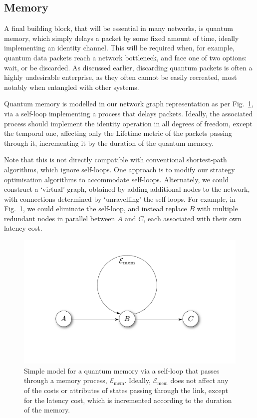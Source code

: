 \documentclass[aps,rmp,twocolumn,amsmath,amssymb,nofootinbib,superscriptaddress,longbibliography,floatfix]{revtex4-1}
\begin{document}
%
%

\subsection{Memory} \label{sec:memory}

A final building block, that will be essential in many networks, is quantum memory, which simply delays a packet by some fixed amount of time, ideally implementing an identity channel. This will be required when, for example, quantum data packets reach a network bottleneck, and face one of two options: wait, or be discarded. As discussed earlier, discarding quantum packets is often a highly undesirable enterprise, as they often cannot be easily recreated, most notably when entangled with other systems.

Quantum memory is modelled in our network graph representation as per Fig.~\ref{fig:memory}, via a self-loop implementing a process that delays packets. Ideally, the associated process should implement the identity operation in all degrees of freedom, except the temporal one, affecting only the {\sc Lifetime} metric of the packets passing through it, incrementing it by the duration of the quantum memory.

Note that this is not directly compatible with conventional shortest-path algorithms, which ignore self-loops. One approach is to modify our strategy optimisation algorithms to accommodate self-loops. Alternately, we could construct a `virtual' graph, obtained by adding additional nodes to the network, with connections determined by `unravelling' the self-loops. For example, in Fig.~\ref{fig:memory}, we could eliminate the self-loop, and instead replace $B$ with multiple redundant nodes in parallel between $A$ and $C$, each associated with their own latency cost.

\begin{figure}[!htb]
\includegraphics[width=0.7\columnwidth]{memory}
\caption{Simple model for a quantum memory via a self-loop that passes through a memory process, $\mathcal{E}_\mathrm{mem}$. Ideally, $\mathcal{E}_\mathrm{mem}$ does not affect any of the costs or attributes of states passing through the link, except for the latency cost, which is incremented according to the duration of the memory.} \label{fig:memory}
\end{figure}
\end{document}
